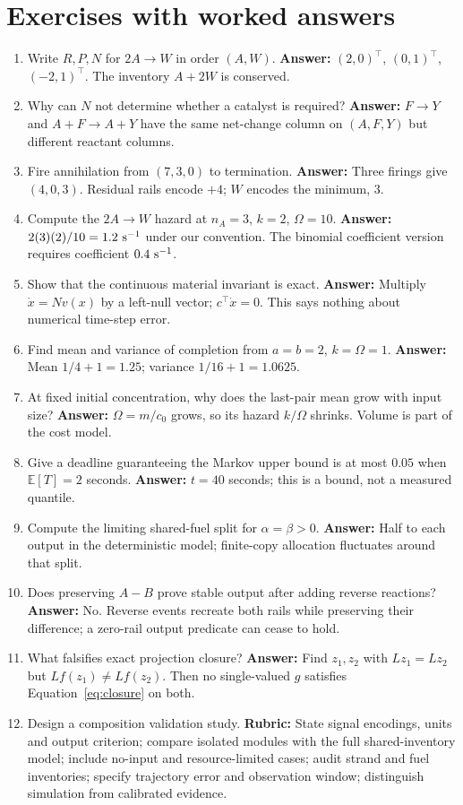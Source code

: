 \section{Exercises with worked answers}
\begin{enumerate}
\item Write $R,P,N$ for $2A\rightarrow W$ in order $(A,W)$.
\textbf{Answer:} $(2,0)^\top$, $(0,1)^\top$, $(-2,1)^\top$.
The inventory $A+2W$ is conserved.
\item Why can $N$ not determine whether a catalyst is required?
\textbf{Answer:} $F\rightarrow Y$ and $A+F\rightarrow A+Y$ have the same
net-change column on $(A,F,Y)$ but different reactant columns.
\item Fire annihilation from $(7,3,0)$ to termination.
\textbf{Answer:} Three firings give $(4,0,3)$. Residual rails encode $+4$;
$W$ encodes the minimum, 3.
\item Compute the $2A\rightarrow W$ hazard at $n_A=3$, $k=2$, $\Omega=10$.
\textbf{Answer:} $2(3)(2)/10=1.2\ {\rm s}^{-1}$ under our convention.
The binomial coefficient version requires coefficient $0.4\ {\rm s}^{-1}$.
\item Show that the continuous material invariant is exact.
\textbf{Answer:} Multiply $\dot x=Nv(x)$ by a left-null vector;
$c^\top\dot x=0$. This says nothing about numerical time-step error.
\item Find mean and variance of completion from $a=b=2$, $k=\Omega=1$.
\textbf{Answer:} Mean $1/4+1=1.25$; variance $1/16+1=1.0625$.
\item At fixed initial concentration, why does the last-pair mean grow with
input size? \textbf{Answer:} $\Omega=m/c_0$ grows, so its hazard $k/\Omega$
shrinks. Volume is part of the cost model.
\item Give a deadline guaranteeing the Markov upper bound is at most $0.05$
when $\mathbb E[T]=2$ seconds.
\textbf{Answer:} $t=40$ seconds; this is a bound, not a measured quantile.
\item Compute the limiting shared-fuel split for $\alpha=\beta>0$.
\textbf{Answer:} Half to each output in the deterministic model; finite-copy
allocation fluctuates around that split.
\item Does preserving $A-B$ prove stable output after adding reverse reactions?
\textbf{Answer:} No. Reverse events recreate both rails while preserving
their difference; a zero-rail output predicate can cease to hold.
\item What falsifies exact projection closure?
\textbf{Answer:} Find $z_1,z_2$ with $Lz_1=Lz_2$ but $Lf(z_1)\ne Lf(z_2)$.
Then no single-valued $g$ satisfies Equation~\ref{eq:closure} on both.
\item Design a composition validation study.
\textbf{Rubric:} State signal encodings, units and output criterion; compare
isolated modules with the full shared-inventory model; include no-input and
resource-limited cases; audit strand and fuel inventories; specify trajectory
error and observation window; distinguish simulation from calibrated evidence.
\end{enumerate}

